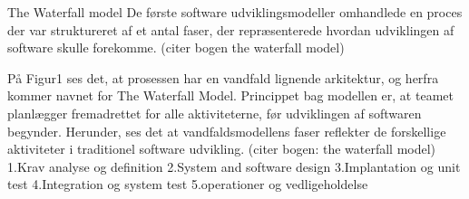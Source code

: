 The Waterfall model 
De første software udviklingsmodeller omhandlede en proces der var struktureret af et antal faser, der repræsenterede hvordan udviklingen af software skulle forekomme. (citer bogen the waterfall model)


På Figur1 ses det, at prosessen har en vandfald lignende arkitektur, og herfra kommer navnet for The Waterfall Model. Princippet bag modellen er, at teamet planlægger fremadrettet for alle aktiviteterne, før udviklingen af softwaren begynder. Herunder, ses det at vandfaldsmodellens faser reflekter de forskellige aktiviteter i traditionel software udvikling. (citer bogen: the waterfall model)
    1.Krav analyse og definition 
    2.System and software design
    3.Implantation og unit test
    4.Integration og system test 
    5.operationer og vedligeholdelse 


